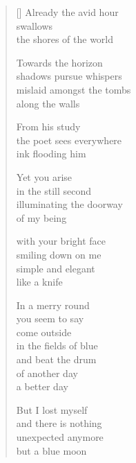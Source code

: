 \documentclass[12pt,a4paper]{article}
\begin{document}
\begin{verse}[\versewidth]
  Already the avid hour \\
  swallows \\
  the shores of the world

  Towards the horizon \\
  shadows pursue whispers \\
  mislaid amongst the tombs \\
  along the walls

  From his study \\
  the poet sees everywhere \\
  ink flooding him

  Yet you arise \\
  in the still second \\
  illuminating the doorway \\
  of my being

  with your bright face \\
  smiling down on me \\
  simple and elegant \\
  like a knife

  In a merry round \\
  you seem to say \\
  come outside \\
  in the fields of blue \\
  and beat the drum \\
  of another day \\
  a better day

  But I lost myself \\
  and there is nothing \\
  unexpected anymore \\
  but a blue moon
\end{verse}






\end{document}
